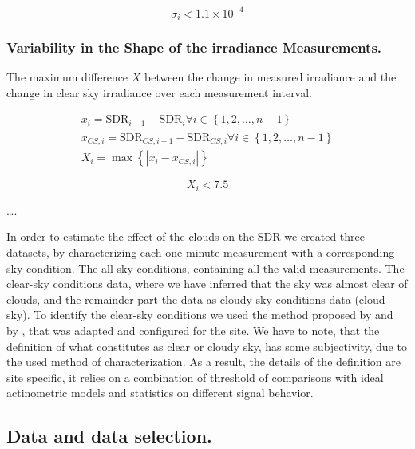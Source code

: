 \documentclass[preprint, 3p,
authoryear]{elsarticle} %
\begin{document}
\begin{equation}
\sigma_i < \ensuremath{1.1\times 10^{-4}}
\label{eq:VCTcr}
\end{equation}

\hypertarget{variability-in-the-shape-of-the-irradiance-measurements.}{%
\subsubsection{Variability in the Shape of the irradiance
Measurements.}\label{variability-in-the-shape-of-the-irradiance-measurements.}}

The maximum difference \(X\) between the change in measured irradiance
and the change in clear sky irradiance over each measurement interval.

\begin{gather}
x_i = \text{SDR}_{i+1} - \text{SDR}_{i} \forall i \in \left \{ 1, 2, \ldots, n-1 \right \} \label{eq:VSM1} \\
x_{CS,i} = \text{SDR}_{CS,i+1} - \text{SDR}_{CS,i} \forall i \in \left \{ 1, 2, \ldots, n-1 \right \} \label{eq:VSM2} \\
X_i = \max{\left \{ \left | x_i - x_{CS,i} \right | \right \}} \label{eq:VSM3}
\end{gather}

\begin{equation}
X_i < 7.5
\label{eq:VSMcr}
\end{equation}

\ldots.

In order to estimate the effect of the clouds on the SDR we created
three datasets, by characterizing each one-minute measurement with a
corresponding sky condition. The all-sky conditions, containing all the
valid measurements. The clear-sky conditions data, where we have
inferred that the sky was almost clear of clouds, and the remainder part
the data as cloudy sky conditions data (cloud-sky). To identify the
clear-sky conditions we used the method proposed by \citet{Long2000} and
by \citet{Reno2016}, that was adapted and configured for the site. We
have to note, that the definition of what constitutes as clear or cloudy
sky, has some subjectivity, due to the used method of characterization.
As a result, the details of the definition are site specific, it relies
on a combination of threshold of comparisons with ideal actinometric
models and statistics on different signal behavior.

\hypertarget{data-and-data-selection.}{%
\subsection{Data and data selection.}\label{data-and-data-selection.}}
\end{document}
